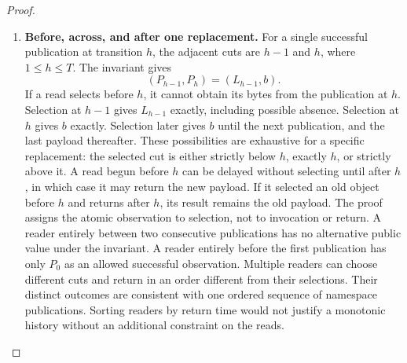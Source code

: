 \documentclass[12pt]{article}
\begin{document}
\begin{proof}
\begin{enumerate}
\item \textbf{Before, across, and after one replacement.}
For a single successful publication at transition $h$,
the adjacent cuts are $h-1$ and $h$, where $1\leq h\leq T$.
The invariant gives
\begin{equation}
\label{eq:adjacent}
 (P_{h-1},P_h)=(L_{h-1},b).
\end{equation}
If a read selects before $h$, it cannot obtain its bytes
from the publication at $h$. Selection at $h-1$ gives
$L_{h-1}$ exactly, including possible absence.
Selection at $h$ gives $b$ exactly.
Selection later gives $b$ until the next publication,
and the last payload thereafter.
These possibilities are exhaustive for a specific replacement:
the selected cut is either strictly below $h$, exactly $h$,
or strictly above it.
A read begun before $h$ can be delayed without selecting
until after $h$, in which case it may return the new payload.
If it selected an old object before $h$ and returns after $h$,
its result remains the old payload.
The proof assigns the atomic observation to selection,
not to invocation or return.
A reader entirely between two consecutive publications
has no alternative public value under the invariant.
A reader entirely before the first publication has only
$P_0$ as an allowed successful observation.
Multiple readers can choose different cuts and return in an
order different from their selections.
Their distinct outcomes are consistent with one ordered
sequence of namespace publications.
Sorting readers by return time would not justify a monotonic
history without an additional constraint on the reads.


\end{enumerate}
\end{proof}
\end{document}
